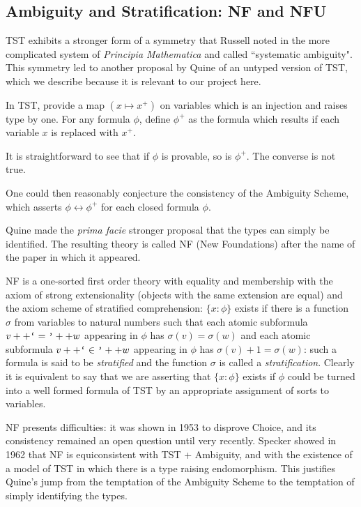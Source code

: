 \documentclass[12pt]{article}
\begin{document}
\subsection{Ambiguity and Stratification:  NF and NFU}

TST exhibits a stronger form of a symmetry that Russell noted in the more complicated system of
{\sl Principia Mathematica} \cite{RW} and called ``systematic ambiguity".  This symmetry led to
another proposal by Quine of an untyped version of TST, which we describe because it is relevant to our project here.

In TST, provide a map $(x \mapsto x^+)$ on variables which is an injection and raises type by one.
For any formula $\phi$, define $\phi^+$ as the formula which results if each variable $x$ is replaced with $x^+$.

It is straightforward to see that if $\phi$ is provable, so is $\phi^+$.  The converse is not true.

One could then reasonably conjecture the consistency of the Ambiguity Scheme, which asserts
$\phi \leftrightarrow \phi^+$ for each closed formula $\phi$.

Quine made the {\sl prima facie} stronger proposal that the types can simply be identified.  The resulting theory is called NF (New Foundations) after the name of the paper in which it appeared.

NF is a one-sorted first order theory with equality and membership with the axiom of strong extensionality
(objects with the same extension are equal) and the axiom scheme of stratified comprehension:  $\{x:\phi\}$ exists if there is a function $\sigma$ from variables to natural numbers such that each atomic subformula
$v++\verb|`|=\verb|'|++w$ appearing in $\phi$ has $\sigma(v)=\sigma(w)$ and each atomic subformula
$v++\verb|`|\in\verb|'|++w$ appearing in $\phi$ has $\sigma(v)+1=\sigma(w)$: such a formula is said to be {\em stratified} and the function $\sigma$ is called a {\em stratification}.  Clearly it is equivalent to say that we are asserting that $\{x:\phi\}$ exists if $\phi$ could be turned into a well formed formula of TST by an appropriate assignment of sorts to variables.

NF presents difficulties:  it was shown in 1953 to disprove Choice, and its consistency remained an open question until very recently.
Specker showed in 1962 that NF is equiconsistent with TST + Ambiguity, and with the existence of a model of TST in which there is a type raising endomorphism.  This justifies Quine's jump from the temptation of the Ambiguity Scheme to the temptation of simply identifying the types.
\end{document}
